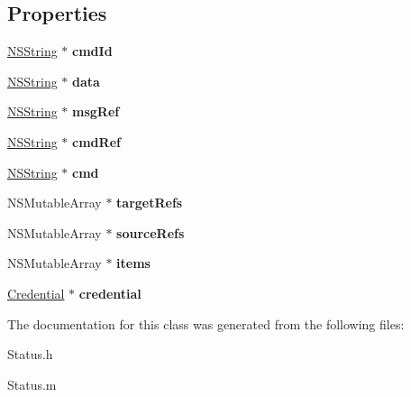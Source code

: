\subsection*{\-Properties}
\begin{DoxyCompactItemize}
\item 
\hypertarget{interface_status_a159f6f2b5ae692e703fb370fd7279bbd}{
\hyperlink{class_n_s_string}{\-N\-S\-String} $\ast$ {\bfseries cmd\-Id}}
\label{interface_status_a159f6f2b5ae692e703fb370fd7279bbd}

\item 
\hypertarget{interface_status_ac06f5da58bf99e8e90b86292ab46c3f8}{
\hyperlink{class_n_s_string}{\-N\-S\-String} $\ast$ {\bfseries data}}
\label{interface_status_ac06f5da58bf99e8e90b86292ab46c3f8}

\item 
\hypertarget{interface_status_a516d210e3c32cbaa52894ab121e7fd98}{
\hyperlink{class_n_s_string}{\-N\-S\-String} $\ast$ {\bfseries msg\-Ref}}
\label{interface_status_a516d210e3c32cbaa52894ab121e7fd98}

\item 
\hypertarget{interface_status_a8b0daa66894a959a79890741bd9de21d}{
\hyperlink{class_n_s_string}{\-N\-S\-String} $\ast$ {\bfseries cmd\-Ref}}
\label{interface_status_a8b0daa66894a959a79890741bd9de21d}

\item 
\hypertarget{interface_status_a9959f4e9a9165f571808d7daf5cf1094}{
\hyperlink{class_n_s_string}{\-N\-S\-String} $\ast$ {\bfseries cmd}}
\label{interface_status_a9959f4e9a9165f571808d7daf5cf1094}

\item 
\hypertarget{interface_status_ab226762144cd8525a8388e5ea30e401b}{
\-N\-S\-Mutable\-Array $\ast$ {\bfseries target\-Refs}}
\label{interface_status_ab226762144cd8525a8388e5ea30e401b}

\item 
\hypertarget{interface_status_ab155041b270431133981aaf082955d42}{
\-N\-S\-Mutable\-Array $\ast$ {\bfseries source\-Refs}}
\label{interface_status_ab155041b270431133981aaf082955d42}

\item 
\hypertarget{interface_status_a99254ef93516d40c98bceed4bef8493e}{
\-N\-S\-Mutable\-Array $\ast$ {\bfseries items}}
\label{interface_status_a99254ef93516d40c98bceed4bef8493e}

\item 
\hypertarget{interface_status_a0c9b7697d88c35028c4761d5412153bd}{
\hyperlink{interface_credential}{\-Credential} $\ast$ {\bfseries credential}}
\label{interface_status_a0c9b7697d88c35028c4761d5412153bd}

\end{DoxyCompactItemize}


\-The documentation for this class was generated from the following files\-:\begin{DoxyCompactItemize}
\item 
\-Status.\-h\item 
\-Status.\-m\end{DoxyCompactItemize}
